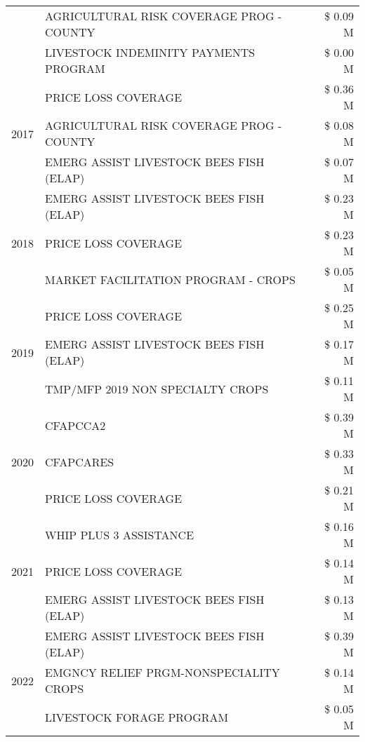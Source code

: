 \begin{tabular}{llr}
 & AGRICULTURAL RISK COVERAGE PROG - COUNTY & \$ 0.09 M \\
 & LIVESTOCK INDEMINITY PAYMENTS PROGRAM & \$ 0.00 M \\
\cline{1-3}
\multirow[t]{3}{*}{2017} & PRICE LOSS COVERAGE & \$ 0.36 M \\
 & AGRICULTURAL RISK COVERAGE PROG - COUNTY & \$ 0.08 M \\
 & EMERG ASSIST LIVESTOCK BEES FISH (ELAP) & \$ 0.07 M \\
\cline{1-3}
\multirow[t]{3}{*}{2018} & EMERG ASSIST LIVESTOCK BEES FISH (ELAP) & \$ 0.23 M \\
 & PRICE LOSS COVERAGE & \$ 0.23 M \\
 & MARKET FACILITATION PROGRAM - CROPS & \$ 0.05 M \\
\cline{1-3}
\multirow[t]{3}{*}{2019} & PRICE LOSS COVERAGE & \$ 0.25 M \\
 & EMERG ASSIST LIVESTOCK BEES FISH (ELAP) & \$ 0.17 M \\
 & TMP/MFP 2019 NON SPECIALTY CROPS & \$ 0.11 M \\
\cline{1-3}
\multirow[t]{3}{*}{2020} & CFAPCCA2 & \$ 0.39 M \\
 & CFAPCARES & \$ 0.33 M \\
 & PRICE LOSS COVERAGE & \$ 0.21 M \\
\cline{1-3}
\multirow[t]{3}{*}{2021} & WHIP PLUS 3 ASSISTANCE & \$ 0.16 M \\
 & PRICE LOSS COVERAGE & \$ 0.14 M \\
 & EMERG ASSIST LIVESTOCK BEES FISH (ELAP) & \$ 0.13 M \\
\cline{1-3}
\multirow[t]{3}{*}{2022} & EMERG ASSIST LIVESTOCK BEES FISH (ELAP) & \$ 0.39 M \\
 & EMGNCY RELIEF PRGM-NONSPECIALITY CROPS & \$ 0.14 M \\
 & LIVESTOCK FORAGE PROGRAM & \$ 0.05 M \\
\cline{1-3}
\bottomrule
\end{tabular}
